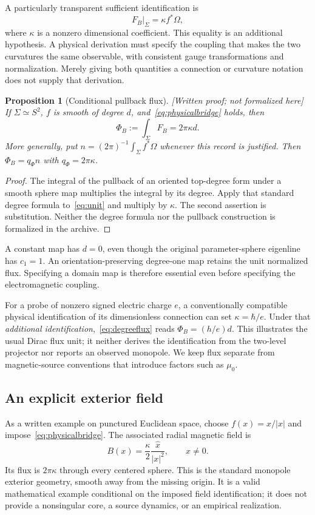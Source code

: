 \documentclass[11pt]{article}
\newtheorem{proposition}[theorem]{Proposition}
\theoremstyle{definition}\newtheorem{definition}[theorem]{Definition}
\theoremstyle{remark}\newtheorem{remark}[theorem]{Remark}
\newcommand{\written}{\textnormal{\small[Written proof; not formalized here]}\ }
\begin{document}
A particularly transparent sufficient identification is
\begin{equation}\label{eq:physicalbridge}
 F_B\big|_\Sigma=\kappa f^*\Omega,
\end{equation}
where $\kappa$ is a nonzero dimensional coefficient. This equality is an additional hypothesis. A physical derivation must specify the coupling that makes the two curvatures the same observable, with consistent gauge transformations and normalization. Merely giving both quantities a connection or curvature notation does not supply that derivation.

\begin{proposition}[Conditional pullback flux]\label{prop:pullback}\written
If $\Sigma\simeq S^2$, $f$ is smooth of degree $d$, and~\eqref{eq:physicalbridge} holds, then
\begin{equation}\label{eq:degreeflux}
 \Phi_B:=\int_\Sigma F_B=2\pi\kappa d.
\end{equation}
More generally, put $n=(2\pi)^{-1}\int_\Sigma f^*\Omega$ whenever this record is justified. Then $\Phi_B=q_\Phi n$ with $q_\Phi=2\pi\kappa$.
\end{proposition}
\begin{proof}
The integral of the pullback of an oriented top-degree form under a smooth sphere map multiplies the integral by its degree. Apply that standard degree formula to~\eqref{eq:unit} and multiply by $\kappa$. The second assertion is substitution. Neither the degree formula nor the pullback construction is formalized in the archive.
\end{proof}
A constant map has $d=0$, even though the original parameter-sphere eigenline has $c_1=1$. An orientation-preserving degree-one map retains the unit normalized flux. Specifying a domain map is therefore essential even before specifying the electromagnetic coupling.

For a probe of nonzero signed electric charge $e$, a conventionally compatible physical identification of its dimensionless connection can set $\kappa=\hbar/e$. Under that \emph{additional identification},~\eqref{eq:degreeflux} reads $\Phi_B=(h/e)d$. This illustrates the usual Dirac flux unit; it neither derives the identification from the two-level projector nor reports an observed monopole. We keep flux separate from magnetic-source conventions that introduce factors such as $\mu_0$.

\subsection{An explicit exterior field}
As a written example on punctured Euclidean space, choose $f(x)=x/|x|$ and impose~\eqref{eq:physicalbridge}. The associated radial magnetic field is
\begin{equation}\label{eq:radial}
 B(x)=\frac{\kappa}{2}\frac{\widehat x}{|x|^2},\qquad x\neq0.
\end{equation}
Its flux is $2\pi\kappa$ through every centered sphere. This is the standard monopole exterior geometry, smooth away from the missing origin. It is a valid mathematical example conditional on the imposed field identification; it does not provide a nonsingular core, a source dynamics, or an empirical realization.
\end{document}
